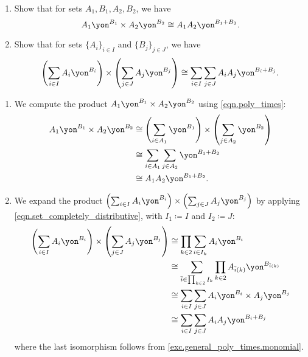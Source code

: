 \documentclass[Book-Poly]{subfiles}
\begin{document}
\begin{exercise} \label{exc.general_poly_times}
\begin{enumerate}
    \item \label{exc.general_poly_times.monomial} Show that for sets $A_1, B_1, A_2, B_2$, we have
    \[
        A_1\yon^{B_1} \times A_2\yon^{B_2} \iso A_1 A_2\yon^{B_1 + B_2}.
    \]
    \item \label{exc.general_poly_times.polynomial} Show that for sets $\{A_i\}_{i \in I}$ and $\{B_j\}_{j \in J}$, we have
    \[
        \left(\sum_{i \in I} A_i\yon^{B_i}\right) \times \left(\sum_{j \in J} A_j\yon^{B_j}\right) \iso \sum_{i \in I} \sum_{j \in J} A_i A_j \yon^{B_i + B_j}.
    \]
\end{enumerate}
\begin{solution}
\begin{enumerate}
    \item We compute the product $A_1\yon^{B_1} \times A_2\yon^{B_2}$ using \eqref{eqn.poly_times}:
    \begin{align*}
        A_1\yon^{B_1} \times A_2\yon^{B_2} &\iso \left(\sum_{i \in A_1} \yon^{B_1}\right) \times \left(\sum_{j \in A_2} \yon^{B_2}\right) \\
        &\iso \sum_{i \in A_1} \sum_{j \in A_2} \yon^{B_1 + B_2} \\
        &\iso A_1 A_2\yon^{B_1 + B_2}.
    \end{align*}

    \item We expand the product $\left(\sum_{i \in I} A_i\yon^{B_i}\right) \times \left(\sum_{j \in J} A_j\yon^{B_j}\right)$ by applying \eqref{eqn.set_completely_distributive}, with $I_1 \coloneqq I$ and $I_2 \coloneqq J$:
    \begin{align*}
        \left(\sum_{i \in I} A_i\yon^{B_i}\right) \times \left(\sum_{j \in J} A_j\yon^{B_j}\right) &\iso \prod_{k \in \2} \sum_{i \in I_k} A_i\yon^{B_i} \\
        &\iso \sum_{\bar{i} \in \prod_{k \in \2} I_k} \prod_{k \in \2} A_{\bar{i}(k)}\yon^{B_{\bar{i}(k)}} \\
        &\iso \sum_{i \in I} \sum_{j \in J} A_i\yon^{B_i} \times A_j\yon^{B_j} \\
        &\iso \sum_{i \in I} \sum_{j \in J} A_i A_j \yon^{B_i + B_j}
    \end{align*}
    where the last isomorphism follows from \cref{exc.general_poly_times.monomial}.
\end{enumerate}
\end{solution}
\end{exercise}
\end{document}
